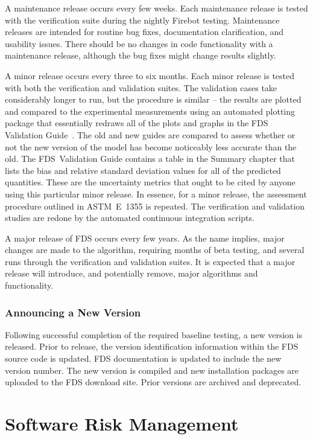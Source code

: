 \documentclass[11pt]{book}
\begin{document}
A maintenance release occurs every few weeks. Each maintenance release is tested with the verification suite during the nightly Firebot testing. Maintenance releases are intended for routine bug fixes, documentation clarification, and usability issues. There should be no changes in code functionality with a maintenance release, although the bug fixes might change results slightly.

A minor release occurs every three to six months. Each minor release is tested with both the verification and validation suites. The validation cases take considerably longer to run, but the procedure is similar -- the results are plotted and compared to the experimental measurements using an automated plotting package that essentially redraws all of the plots and graphs in the FDS Validation Guide~\cite{FDS_Validation_Guide}. The old and new guides are compared to assess whether or not the new version of the model has become noticeably less accurate than the old. The FDS~Validation Guide contains a table in the Summary chapter that lists the bias and relative standard deviation values for all of the predicted quantities. These are the uncertainty metrics that ought to be cited by anyone using this particular minor release. In essence, for a minor release, the assessment procedure outlined in ASTM~E~1355 is repeated. The verification and validation studies are redone by the automated continuous integration scripts.

A major release of FDS occurs every few years. As the name implies, major changes are made to the algorithm, requiring months of beta testing, and several runs through the verification and validation suites. It is expected that a major release will introduce, and potentially remove, major algorithms and functionality.


\subsection{Announcing a New Version}

Following successful completion of the required baseline testing, a new version is released.  Prior to release, the version identification information within the FDS source code is updated.  FDS documentation is updated to include the new version number.  The new version is compiled and new installation packages are uploaded to the FDS download site.  Prior versions are archived and deprecated.



\chapter{Software Risk Management}
\end{document}

